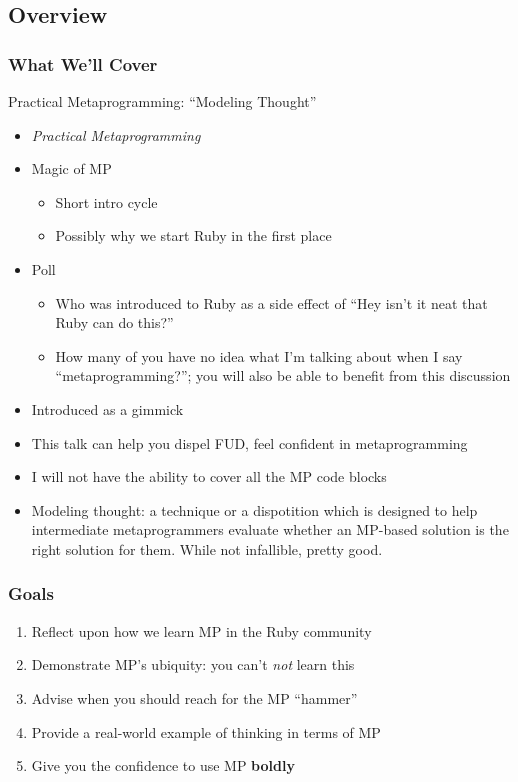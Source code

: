 \documentclass[slidestop,compress,mathserif]{beamer}
\begin{document}
\subsection{Overview}

\begin{frame}
	\frametitle{What We'll Cover}
	\begin{center}
		Practical Metaprogramming:  ``Modeling Thought''
	\end{center}
\end{frame}
\note
{
\tiny              
\begin{itemize}
	\item \emph{Practical Metaprogramming}
	\item Magic of MP
	\begin{itemize}        
		\tiny
		\item Short intro cycle
		\item Possibly why we start Ruby in the first place
	\end{itemize}
	\item Poll
	\begin{itemize}     
		\tiny
		\item Who was introduced to Ruby as a side effect of ``Hey isn't it neat that Ruby can do this?''
		\item How many of you have no idea what I'm talking about when I say ``metaprogramming?''; you will also be able to benefit from this discussion
	\end{itemize}
	\item Introduced as a gimmick
	\item This talk can	help you dispel FUD, feel confident in metaprogramming       
	\item I	will not have the ability to cover all the MP code blocks         
	\item Modeling thought: a technique or a dispotition which is designed to help intermediate metaprogrammers evaluate whether an MP-based
	solution is the right solution for them.  While not infallible, pretty good. 
\end{itemize}
\normalsize
}

\begin{frame}
	\frametitle{Goals}
	\begin{enumerate}
		\item Reflect upon how we learn MP in the Ruby community
		\pause
		\item Demonstrate MP's ubiquity:  you can't \emph{not} learn this
		\pause
		\item Advise when you should reach for the MP ``hammer''
		\pause
		\item Provide a real-world example of thinking in terms of MP
		\pause
		\item Give you the confidence to use MP \textbf{boldly}
	\end{enumerate}
\end{frame}
\end{document}
